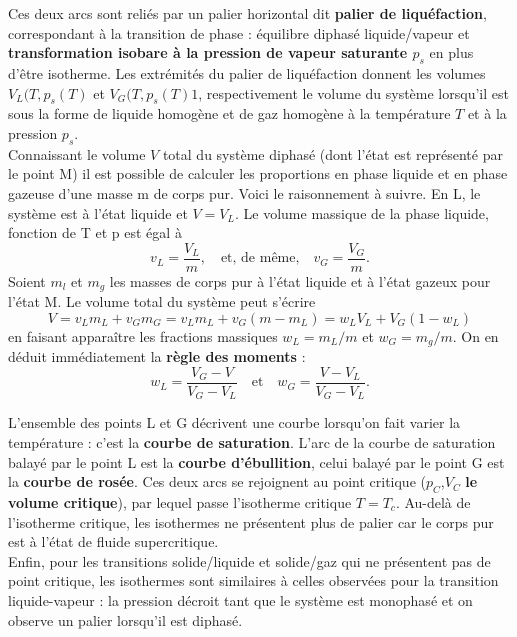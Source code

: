 \documentclass[11pt,a4paper]{report}
\begin{document}
Ces deux arcs sont reliés par un palier horizontal dit \textbf{palier de liquéfaction}, correspondant à la transition de phase : équilibre diphasé liquide/vapeur et \textbf{transformation isobare à la pression de vapeur saturante $p_s$} en plus d'être isotherme. Les extrémités du palier de liquéfaction donnent les volumes $V_L(T,p_s(T)$ et $V_G(T,p_s(T)1$, respectivement le volume du système lorsqu'il est sous la forme de liquide homogène et de gaz homogène à la température $T$ et à la pression $p_s$.\\

Connaissant le volume $V$ total du système diphasé (dont l'état est représenté par le point M) il est possible de calculer les proportions en phase liquide et en phase gazeuse d'une masse m de corps pur. Voici le raisonnement à suivre. En L, le système est à l'état liquide et $V = V_L$. Le volume massique de la phase liquide, fonction de T et p est égal à 
\begin{equation}
	v_L = \frac{V_L}{m},\quad\text{et, de même,}\quad v_G = \frac{V_G}{m}.
\end{equation}
Soient $m_l$ et $m_g$ les masses de corps pur à l'état liquide et à l'état gazeux pour l'état M. Le volume total du système peut s'écrire
\begin{equation}
	V = v_L m_L + v_G m_G = v_L m_L + v_G (m - m_L) = w_L V_L + V_G(1-w_L)
\end{equation}
en faisant apparaître les fractions massiques $w_L = m_L/m$ et $w_G = m_g/m$.
On en déduit immédiatement la \textbf{règle des moments} :
\begin{equation}
	\boxed{w_L = \frac{V_G - V}{V_G - V_L}}\quad\text{et}\quad 
	\boxed{w_G = \frac{V - V_L}{V_G - V_L}}.
\end{equation}

L'ensemble des points L et G décrivent une courbe lorsqu'on fait varier la température : c'est la \textbf{courbe de saturation}. L'arc de la courbe de saturation balayé par le point L est la \textbf{courbe d'ébullition}, celui balayé par le point G est la \textbf{courbe de rosée}. Ces deux arcs se rejoignent au point critique ($p_C$,$V_C$ \textbf{le volume critique}), par lequel passe l'isotherme critique $T = T_c$. Au-delà de l'isotherme critique, les isothermes ne présentent plus de palier car le corps pur est à l'état de fluide supercritique.\\

Enfin, pour les transitions solide/liquide et solide/gaz qui ne présentent pas de point critique, les isothermes sont similaires à celles observées pour la transition liquide-vapeur : la pression décroit tant que le système est monophasé et on observe un palier lorsqu'il est diphasé.
\end{document}
